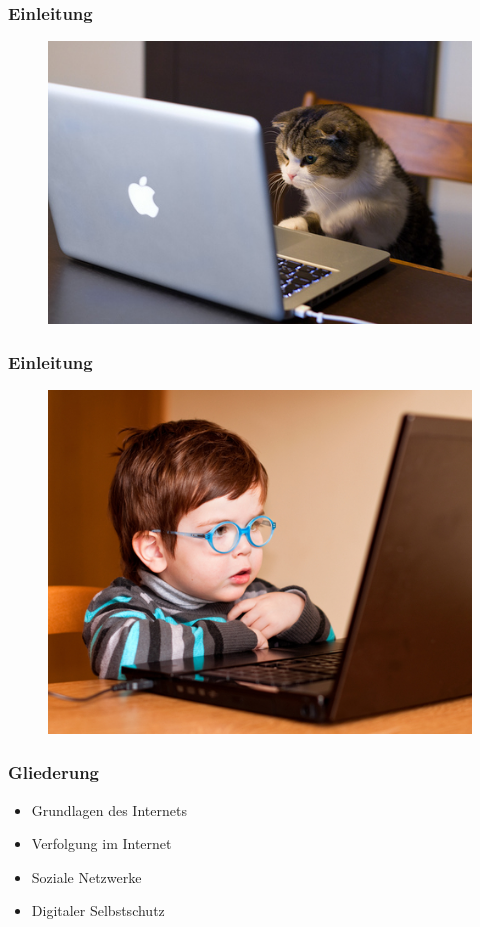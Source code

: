 \documentclass[12pt]{beamer}
\begin{document}
\begin{frame}
  \frametitle{Einleitung}
  \begin{figure}
    \includegraphics[height=0.7\textheight]{img/internet_user4.jpg}
  \end{figure}
\end{frame}

\begin{frame}
  \frametitle{Einleitung}
  \begin{figure}
    \includegraphics[height=0.7\textheight]{img/internet_user2.jpg}
  \end{figure}
\end{frame}

\begin{frame}
  \frametitle{Gliederung}
  \begin{itemize} \Large
    \item Grundlagen des Internets
    \item Verfolgung im Internet
    \item Soziale Netzwerke
    \item Digitaler Selbstschutz
  \end{itemize}
\end{frame}
\end{document}

